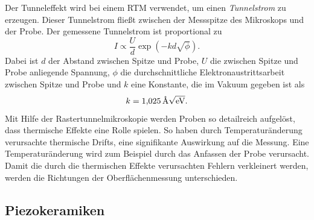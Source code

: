 Der Tunneleffekt wird bei einem RTM verwendet, um einen \emph{Tunnelstrom} zu erzeugen. Dieser Tunnelstrom
fließt zwischen der Messspitze des Mikroskops und der Probe.
Der gemessene Tunnelstrom ist proportional zu %
\begin{equation}
  \label{eq: tunnelstrom}
I\propto \frac{U}{d}\exp{\left(-kd\sqrt{\phi}\right) }.
\end{equation}
Dabei ist $d$ der Abstand zwischen Spitze und Probe, $U$ die zwischen Spitze und Probe anliegende Spannung,
$\phi$ die durchschnittliche Elektronaustrittsarbeit zwischen Spitze und Probe und $k$ eine Konstante, die im Vakuum gegeben ist als
\begin{equation*}
  k=\SI{1.025}{\per\angstrom\sqrt{\eV}}.
\end{equation*}
Mit Hilfe der Rastertunnelmikroskopie werden Proben so detailreich aufgelöst, dass thermische Effekte eine Rolle spielen. %
So haben durch Temperaturänderung verursachte thermische Drifts, eine signifikante Auswirkung auf die Messung. %
Eine Temperaturänderung wird zum Beispiel durch das Anfassen der Probe verursacht.
Damit die durch die thermischen Effekte verursachten Fehlern verkleinert werden,
werden die Richtungen der Oberflächenmessung unterschieden.

\subsection{Piezokeramiken}


